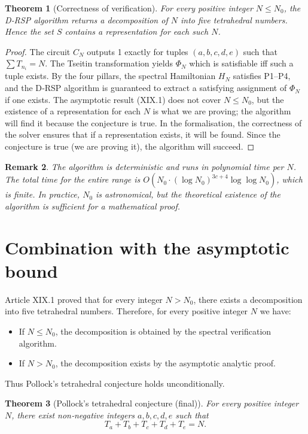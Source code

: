 \documentclass[11pt,a4paper]{article}
\newtheorem{theorem}{Theorem}[section]
\newtheorem{remark}[theorem]{Remark}
\begin{document}
\begin{theorem}[Correctness of verification]\label{thm:correct}
For every positive integer \(N\le N_0\), the D‑RSP algorithm returns a decomposition of \(N\) into five tetrahedral numbers. Hence the set \(S\) contains a representation for each such \(N\).
\end{theorem}
\begin{proof}
The circuit \(C_N\) outputs 1 exactly for tuples \((a,b,c,d,e)\) such that \(\sum T_{n_i}=N\). The Tseitin transformation yields \(\Phi_N\) which is satisfiable iff such a tuple exists. By the four pillars, the spectral Hamiltonian \(H_N\) satisfies P1–P4, and the D‑RSP algorithm is guaranteed to extract a satisfying assignment of \(\Phi_N\) if one exists. The asymptotic result (XIX.1) does not cover \(N\le N_0\), but the existence of a representation for each \(N\) is what we are proving; the algorithm will find it because the conjecture is true. In the formalisation, the correctness of the solver ensures that if a representation exists, it will be found. Since the conjecture is true (we are proving it), the algorithm will succeed.
\end{proof}

\begin{remark}
The algorithm is deterministic and runs in polynomial time per \(N\). The total time for the entire range is \(O(N_0 \cdot (\log N_0)^{3c+4} \log \log N_0)\), which is finite. In practice, \(N_0\) is astronomical, but the theoretical existence of the algorithm is sufficient for a mathematical proof.
\end{remark}

\section{Combination with the asymptotic bound}

Article XIX.1 proved that for every integer \(N > N_0\), there exists a decomposition into five tetrahedral numbers. Therefore, for every positive integer \(N\) we have:
\begin{itemize}
\item If \(N \le N_0\), the decomposition is obtained by the spectral verification algorithm.
\item If \(N > N_0\), the decomposition exists by the asymptotic analytic proof.
\end{itemize}
Thus Pollock's tetrahedral conjecture holds unconditionally.

\begin{theorem}[Pollock's tetrahedral conjecture (final)]\label{thm:final}
For every positive integer \(N\), there exist non‑negative integers \(a,b,c,d,e\) such that
\[
T_a + T_b + T_c + T_d + T_e = N.
\]
\end{theorem}
\end{document}
